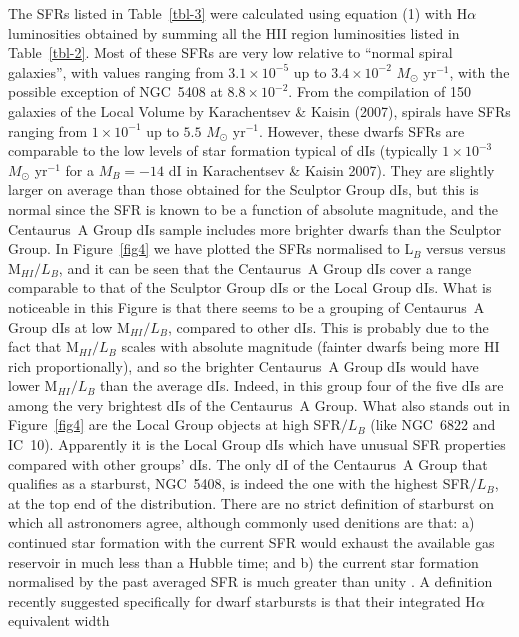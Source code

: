 \documentclass[preprint]{aastex}
\begin{document}
The SFRs listed in Table~\ref{tbl-3} were calculated using equation (1) 
with H$\alpha$ luminosities obtained by summing 
all the HII region luminosities listed in Table~\ref{tbl-2}.
Most of these SFRs are very low relative to ``normal spiral galaxies'', with values
ranging from $3.1\times 10^{-5}$ up to $3.4\times 10^{-2}$ $M_{\odot}$ yr$^{-1}$, 
with the 
possible exception of NGC~5408 at $8.8\times 10^{-2}$. From the compilation of
150 galaxies of the Local Volume by Karachentsev \& Kaisin (2007), spirals have SFRs ranging
from $1\times 10^{-1}$ up to $5.5$ $M_{\odot}$ yr$^{-1}$.
 However, these dwarfs SFRs 
are comparable
to the low levels of star formation typical of dIs (typically $1\times 10^{-3}$ 
$M_{\odot}$ yr$^{-1}$ for a $M_B=-14$ dI in Karachentsev \& Kaisin 2007). They are slightly
larger on average than those obtained for the Sculptor Group dIs, but
this is normal since the SFR is known to be a function of absolute magnitude,
and the Centaurus~A Group dIs sample includes more brighter dwarfs 
than the Sculptor Group. 
In Figure~\ref{fig4} we have plotted the SFRs normalised to L$_B$ versus
versus M$_{HI}/L_B$, and it can be seen that 
the Centaurus~A Group dIs cover a range comparable to that of the 
Sculptor Group dIs or the Local Group dIs. 
What is noticeable in this Figure 
is that there seems to be a grouping of Centaurus~A Group dIs at low
M$_{HI}/L_B$, compared to other dIs. This is probably
due to the fact that M$_{HI}/L_B$ scales with absolute magnitude
(fainter dwarfs being more HI rich proportionally), and so the brighter 
Centaurus~A Group dIs
would have lower M$_{HI}/L_B$ than the average dIs. Indeed, in this group
four of the five dIs are among the very brightest dIs of the Centaurus~A Group.
What also stands out in Figure~\ref{fig4} are
the Local Group objects at high SFR$/L_B$ 
(like NGC~6822 and IC~10). Apparently it is the Local Group dIs which have
unusual SFR properties compared with other groups' dIs. The only
dI of the Centaurus~A Group that qualifies as a starburst, NGC~5408, is indeed the one
with the highest SFR$/L_B$, at the top end of the distribution. There are no strict definition of starburst on which all astronomers agree, although commonly used denitions are that:
a) continued star formation with the current SFR would exhaust the available gas reservoir
in much less than a Hubble time; and b) the current star formation normalised by the
past averaged SFR is much greater than unity \citep{ga05}. A definition recently
suggested specifically for dwarf starbursts is that their integrated H$\alpha$ equivalent width
\end{document}

